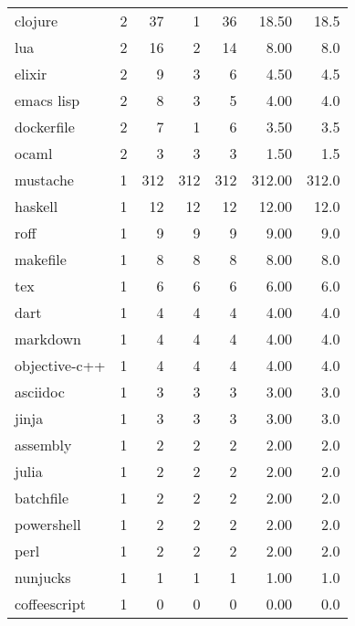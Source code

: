 \begin{tabular}{lrrrrrr}
clojure       &          2 &          37 &    1 &   36 &   18.50 &     18.5 \\
lua           &          2 &          16 &    2 &   14 &    8.00 &      8.0 \\
elixir        &          2 &           9 &    3 &    6 &    4.50 &      4.5 \\
emacs lisp    &          2 &           8 &    3 &    5 &    4.00 &      4.0 \\
dockerfile    &          2 &           7 &    1 &    6 &    3.50 &      3.5 \\
ocaml         &          2 &           3 &    3 &    3 &    1.50 &      1.5 \\
mustache      &          1 &         312 &  312 &  312 &  312.00 &    312.0 \\
haskell       &          1 &          12 &   12 &   12 &   12.00 &     12.0 \\
roff          &          1 &           9 &    9 &    9 &    9.00 &      9.0 \\
makefile      &          1 &           8 &    8 &    8 &    8.00 &      8.0 \\
tex           &          1 &           6 &    6 &    6 &    6.00 &      6.0 \\
dart          &          1 &           4 &    4 &    4 &    4.00 &      4.0 \\
markdown      &          1 &           4 &    4 &    4 &    4.00 &      4.0 \\
objective-c++ &          1 &           4 &    4 &    4 &    4.00 &      4.0 \\
asciidoc      &          1 &           3 &    3 &    3 &    3.00 &      3.0 \\
jinja         &          1 &           3 &    3 &    3 &    3.00 &      3.0 \\
assembly      &          1 &           2 &    2 &    2 &    2.00 &      2.0 \\
julia         &          1 &           2 &    2 &    2 &    2.00 &      2.0 \\
batchfile     &          1 &           2 &    2 &    2 &    2.00 &      2.0 \\
powershell    &          1 &           2 &    2 &    2 &    2.00 &      2.0 \\
perl          &          1 &           2 &    2 &    2 &    2.00 &      2.0 \\
nunjucks      &          1 &           1 &    1 &    1 &    1.00 &      1.0 \\
coffeescript  &          1 &           0 &    0 &    0 &    0.00 &      0.0 \\
\bottomrule
\end{tabular}
